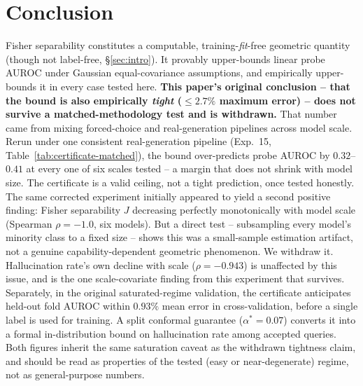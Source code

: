 \documentclass[10pt,twocolumn]{article}
\newcommand{\FloatBarrier}{\clearpage}
\begin{document}
\FloatBarrier
\section{Conclusion}
\label{sec:conclusion}

Fisher separability constitutes a computable, training-\emph{fit}-free
geometric quantity (though not label-free, \S\ref{sec:intro}). It
provably upper-bounds linear probe AUROC under Gaussian
equal-covariance assumptions, and empirically upper-bounds it in every
case tested here. \textbf{This paper's original conclusion -- that the
bound is also empirically \emph{tight} ($\leq 2.7\%$ maximum error) --
does not survive a matched-methodology test and is withdrawn.} That
number came from mixing forced-choice and real-generation pipelines
across model scale. Rerun under one consistent real-generation pipeline
(Exp.~15, Table~\ref{tab:certificate-matched}), the bound over-predicts
probe AUROC by $0.32$--$0.41$ at every one of six scales tested -- a
margin that does not shrink with model size. The certificate is a
valid ceiling, not a tight prediction, once tested honestly. The same
corrected experiment initially appeared to yield a second positive
finding: Fisher separability $J$ decreasing perfectly monotonically
with model scale (Spearman $\rho=-1.0$, six models). But a direct test
-- subsampling every model's minority class to a fixed size -- shows
this was a small-sample estimation artifact, not a genuine
capability-dependent geometric phenomenon. We withdraw it.
Hallucination rate's own decline with scale ($\rho=-0.943$) is
unaffected by this issue, and is the one scale-covariate finding from
this experiment that survives. Separately, in the original
saturated-regime validation, the certificate anticipates held-out fold
AUROC within $0.93\%$ mean error in cross-validation, before a single
label is used for training. A split conformal guarantee ($\alpha^* =
0.07$) converts it into a formal in-distribution bound on hallucination
rate among accepted queries. Both figures inherit the same saturation
caveat as the withdrawn tightness claim, and should be read as
properties of the tested (easy or near-degenerate) regime, not as
general-purpose numbers.
\end{document}
